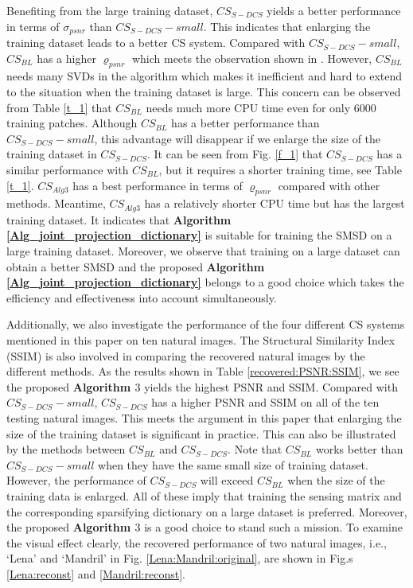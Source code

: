 \documentclass[final,5p,times,twocolumn]{elsarticle}
\begin{document}
Benefiting from the large training dataset, $CS_{S-DCS}$ yields a better performance in terms of $\sigma_{psnr}$ than $CS_{S-DCS}-small$. This indicates that enlarging the training dataset leads to a better CS system. Compared with $CS_{S-DCS}-small$, $CS_{BL}$ has a higher $\varrho_{psnr}$ which meets the observation shown in \cite{BLLLJC15}. However, $CS_{BL}$ needs many SVDs in the algorithm which makes it inefficient and hard to extend to the situation when the training dataset is large. This concern can be observed from Table \ref{t_1} that $CS_{BL}$ needs much more CPU time even for only $6000$ training patches. Although $CS_{BL}$ has a better performance than $CS_{S-DCS}-small$, this advantage will disappear if we enlarge the size of the training dataset in $CS_{S-DCS}$. It can be seen from Fig. \ref{f_1} that $CS_{S-DCS}$ has a similar performance with $CS_{BL}$, but it requires a shorter training time, see Table \ref{t_1}. $CS_{Alg3}$ has a best performance in terms of $\varrho_{psnr}$ compared with other methods. Meantime, $CS_{Alg3}$ has a relatively shorter CPU time but has the largest training dataset. It indicates that {\bf Algorithm \ref{Alg_joint_projection_dictionary}} is suitable for training the SMSD on a large training dataset. Moreover, we observe that training on a large dataset can obtain a better SMSD and the proposed {\bf Algorithm \ref{Alg_joint_projection_dictionary}} belongs to a good choice which takes the efficiency and effectiveness into account simultaneously.

Additionally, we also investigate the performance of the four different CS systems mentioned in this paper on ten natural images. The Structural Similarity Index (SSIM) \cite{ZBSS04} is also involved in comparing the recovered natural images by the different methods. As the results shown in Table \ref{recovered:PSNR:SSIM}, we see the proposed {\bf Algorithm $3$} yields the highest PSNR and SSIM. Compared with $CS_{S-DCS}-small$, $CS_{S-DCS}$ has a higher PSNR and SSIM on all of the ten testing natural images. This meets the argument in this paper that enlarging the size of the training dataset is significant in practice. This can also be illustrated by the methods between $CS_{BL}$ and $CS_{S-DCS}$. Note that $CS_{BL}$ works better than $CS_{S-DCS}-small$ when they have the same small size of training dataset. However, the performance of $CS_{S-DCS}$ will exceed $CS_{BL}$ when the size of the training data is enlarged. All of these imply that training the sensing matrix and the corresponding sparsifying dictionary on a large dataset is preferred. Moreover, the proposed {\bf Algorithm $3$} is a good choice to stand such a mission. To examine the visual effect clearly, the recovered performance of two natural images, i.e., `Lena' and `Mandril' in Fig. \ref{Lena:Mandril:original}, are shown in Fig.s \ref{Lena:reconst} and \ref{Mandril:reconst}.
\end{document}
